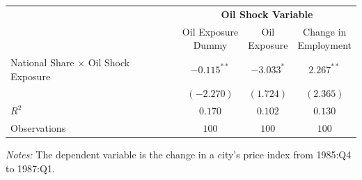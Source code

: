 \begin{minipage}{\textwidth}
    \centering
    \small
    \renewcommand{\arraystretch}{1.12}
    \begin{tabular}{@{}lccc@{}}
        \toprule
        & \multicolumn{3}{c}{\textbf{Oil Shock Variable}} \\
        \cmidrule(lr){2-4}
        & \shortstack{Oil Exposure\\Dummy}
        & \shortstack{Oil\\Exposure}
        & \shortstack{Change in\\Employment} \\
        \midrule
        National Share $\times$ Oil Shock Exposure
            & $-0.115^{**}$ & $-3.033^{*}$ & $2.267^{**}$ \\
            & $(-2.270)$
            & $(1.724)$
            & $(2.365)$ \\
        \midrule
        $R^2$ & $0.170$ & $0.102$ & $0.130$ \\
        Observations & $100$ & $100$ & $100$ \\
        \bottomrule
    \end{tabular}

    \vspace{0.15cm}
    \centering
    \footnotesize
    \textit{Notes:} The dependent variable is the change in a city's price index from
    1985:Q4 to 1987:Q1.
\end{minipage}
